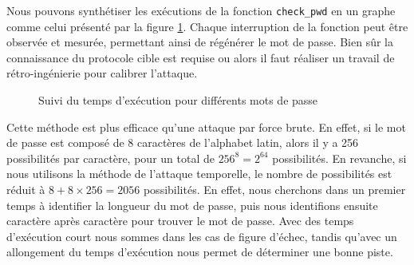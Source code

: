 Nous pouvons synthétiser les exécutions de la fonction \texttt{check\_pwd} en un graphe comme celui présenté par la figure \ref{fig:timing_attack_example}. Chaque interruption de la fonction peut être observée et mesurée, permettant ainsi de régénérer le mot de passe. Bien sûr la connaissance du protocole cible est requise ou alors il faut réaliser un travail de rétro-ingénierie pour calibrer l'attaque.\medbreak

\begin{figure}[!ht]
    \caption{Suivi du temps d'exécution pour différents mots de passe}
    \label{fig:timing_attack_example}
    \center
\end{figure}

Cette méthode est plus efficace qu'une attaque par force brute. En effet, si le mot de passe est composé de 8 caractères de l'alphabet latin, alors il y a 256 possibilités par caractère, pour un total de $256^8 = 2^{64}$ possibilités. En revanche, si nous utilisons la méthode de l'attaque temporelle, le nombre de possibilités est réduit à $8 + 8 \times 256 = 2056$ possibilités. En effet, nous cherchons dans un premier temps à identifier la longueur du mot de passe, puis nous identifions ensuite caractère après caractère pour trouver le mot de passe. Avec des temps d'exécution court nous sommes dans les cas de figure d'échec, tandis qu'avec un allongement du temps d'exécution nous permet de déterminer une bonne piste.\medbreak

